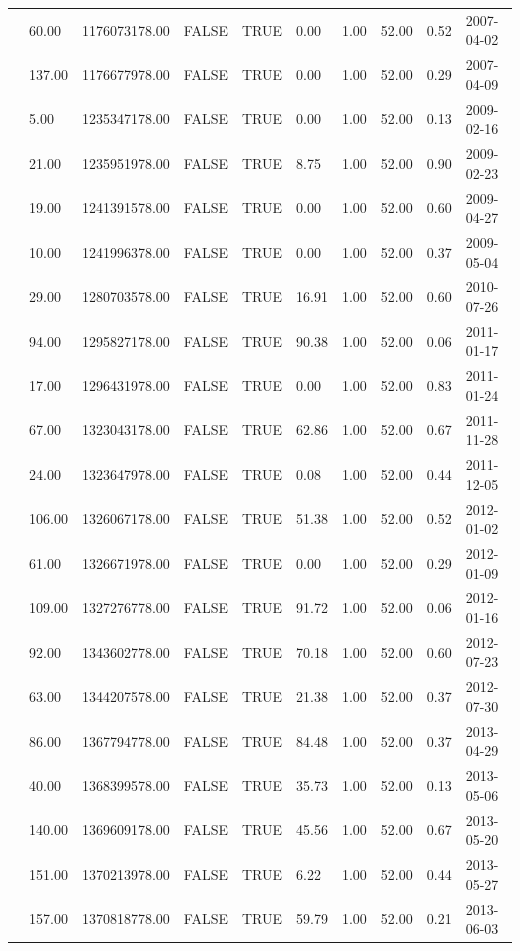 \begin{table}[ht]
\begin{adjustwidth}{-2cm}{}
\begin{tabular}{llllllllll}
 & 60.00 & 1176073178.00 & FALSE & TRUE & 0.00 & 1.00 & 52.00 & 0.52 & 2007-04-02 \\ 
 & 137.00 & 1176677978.00 & FALSE & TRUE & 0.00 & 1.00 & 52.00 & 0.29 & 2007-04-09 \\ 
 & 5.00 & 1235347178.00 & FALSE & TRUE & 0.00 & 1.00 & 52.00 & 0.13 & 2009-02-16 \\ 
 & 21.00 & 1235951978.00 & FALSE & TRUE & 8.75 & 1.00 & 52.00 & 0.90 & 2009-02-23 \\ 
 & 19.00 & 1241391578.00 & FALSE & TRUE & 0.00 & 1.00 & 52.00 & 0.60 & 2009-04-27 \\ 
 & 10.00 & 1241996378.00 & FALSE & TRUE & 0.00 & 1.00 & 52.00 & 0.37 & 2009-05-04 \\ 
 & 29.00 & 1280703578.00 & FALSE & TRUE & 16.91 & 1.00 & 52.00 & 0.60 & 2010-07-26 \\ 
 & 94.00 & 1295827178.00 & FALSE & TRUE & 90.38 & 1.00 & 52.00 & 0.06 & 2011-01-17 \\ 
 & 17.00 & 1296431978.00 & FALSE & TRUE & 0.00 & 1.00 & 52.00 & 0.83 & 2011-01-24 \\ 
 & 67.00 & 1323043178.00 & FALSE & TRUE & 62.86 & 1.00 & 52.00 & 0.67 & 2011-11-28 \\ 
 & 24.00 & 1323647978.00 & FALSE & TRUE & 0.08 & 1.00 & 52.00 & 0.44 & 2011-12-05 \\ 
 & 106.00 & 1326067178.00 & FALSE & TRUE & 51.38 & 1.00 & 52.00 & 0.52 & 2012-01-02 \\ 
 & 61.00 & 1326671978.00 & FALSE & TRUE & 0.00 & 1.00 & 52.00 & 0.29 & 2012-01-09 \\ 
 & 109.00 & 1327276778.00 & FALSE & TRUE & 91.72 & 1.00 & 52.00 & 0.06 & 2012-01-16 \\ 
 & 92.00 & 1343602778.00 & FALSE & TRUE & 70.18 & 1.00 & 52.00 & 0.60 & 2012-07-23 \\ 
 & 63.00 & 1344207578.00 & FALSE & TRUE & 21.38 & 1.00 & 52.00 & 0.37 & 2012-07-30 \\ 
 & 86.00 & 1367794778.00 & FALSE & TRUE & 84.48 & 1.00 & 52.00 & 0.37 & 2013-04-29 \\ 
 & 40.00 & 1368399578.00 & FALSE & TRUE & 35.73 & 1.00 & 52.00 & 0.13 & 2013-05-06 \\ 
 & 140.00 & 1369609178.00 & FALSE & TRUE & 45.56 & 1.00 & 52.00 & 0.67 & 2013-05-20 \\ 
 & 151.00 & 1370213978.00 & FALSE & TRUE & 6.22 & 1.00 & 52.00 & 0.44 & 2013-05-27 \\ 
 & 157.00 & 1370818778.00 & FALSE & TRUE & 59.79 & 1.00 & 52.00 & 0.21 & 2013-06-03 \\ 

\end{tabular}
\end{adjustwidth}
\end{table}
